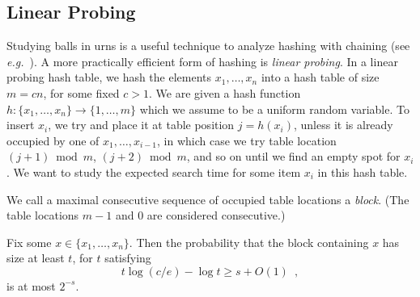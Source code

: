 \documentclass{patmorin}
\begin{document}
\subsection{Linear Probing}

Studying balls in urns is a useful technique to analyze hashing with
chaining (see \emph{e.g.}~\cite[Section~5.1]{morin:open}). A more
practically efficient form of hashing is \emph{linear probing}.  In a
linear probing hash table, we hash the elements $x_1, \ldots, x_n$
into a hash table of size $m=cn$, for some fixed $c> 1$. We are given
a hash function $h : \{x_1, \ldots, x_n\} \to \{1, \ldots, m\}$ which
we assume to be a uniform random variable. To insert $x_i$, we try and
place it at table position $j=h(x_i)$, unless it is already occupied
by one of $x_1,\ldots,x_{i-1}$, in which case we try table location
$(j+1)\bmod m$, $(j+2)\bmod m$, and so on until we find an empty spot
for $x_i$.  We want to study the expected search time for some item
$x_i$ in this hash table.

We call a maximal consecutive sequence of occupied table locations a
\emph{block}. (The table locations $m-1$ and $0$ are considered
consecutive.)

\begin{thm}
  Fix some $x\in\{x_1,\ldots,x_n\}$. Then the probability that the
  block containing $x$ has size at least $t$, for $t$ satisfying
  \[
    t \log (c/e) - \log t \ge s + O(1) \enspace ,
  \]
  is at most $2^{-s}$.
\end{thm}
\end{document}
